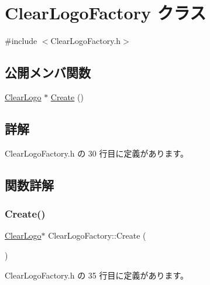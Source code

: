 \hypertarget{class_clear_logo_factory}{}\section{Clear\+Logo\+Factory クラス}
\label{class_clear_logo_factory}


{\ttfamily \#include $<$Clear\+Logo\+Factory.\+h$>$}

\subsection*{公開メンバ関数}
\begin{DoxyCompactItemize}
\item 
\mbox{\hyperlink{class_clear_logo}{Clear\+Logo}} $\ast$ \mbox{\hyperlink{class_clear_logo_factory_a98ea5747e5605f30d58be670ad4cac4a}{Create}} ()
\end{DoxyCompactItemize}


\subsection{詳解}


 Clear\+Logo\+Factory.\+h の 30 行目に定義があります。



\subsection{関数詳解}
\mbox{\label{class_clear_logo_factory_a98ea5747e5605f30d58be670ad4cac4a}} 
\subsubsection{\texorpdfstring{Create()}{Create()}}
{\footnotesize\ttfamily \mbox{\hyperlink{class_clear_logo}{Clear\+Logo}}$\ast$ Clear\+Logo\+Factory\+::\+Create (\begin{DoxyParamCaption}{ }\end{DoxyParamCaption})\hspace{0.3cm}{\ttfamily [inline]}}



 Clear\+Logo\+Factory.\+h の 35 行目に定義があります。

